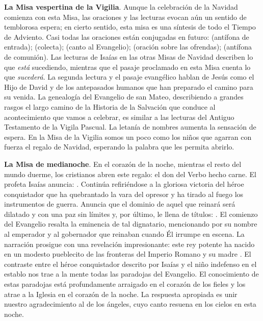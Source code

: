 \begin{body}
\begin{body}
\textbf{La Misa vespertina de la Vigilia}. Aunque la celebración de la Navidad comienza con esta Misa, las oraciones y las lecturas evocan aún un sentido de temblorosa espera; en cierto sentido, esta misa es una síntesis de todo el Tiempo de Adviento. Casi todas las oraciones están conjugadas en futuro:  (antífona de entrada);  (colecta);  (canto al Evangelio);  (oración sobre las ofrendas);  (antífona de comunión). Las lecturas de Isaías en las otras Misas de Navidad describen lo que \emph{está} sucediendo, mientras que el pasaje proclamado en esta Misa cuenta lo que \emph{sucederá}. La segunda lectura y el pasaje evangélico hablan de Jesús como el Hijo de David y de los antepasados humanos que han preparado el camino para su venida. La genealogía del Evangelio de san Mateo, describiendo a grandes rasgos el largo camino de la Historia de la Salvación que conduce al acontecimiento que vamos a celebrar, es similar a las lecturas del Antiguo Testamento de la Vigila Pascual. La letanía de nombres aumenta la sensación de espera. En la Misa de la Vigilia somos un poco como los niños que agarran con fuerza el regalo de Navidad, esperando la palabra que les permita abrirlo.

\textbf{La Misa de medianoche}. En el corazón de la noche, mientras el resto del mundo duerme, los cristianos abren este regalo: el don del Verbo hecho carne. El profeta Isaías anuncia: . Continúa refiriéndose a la gloriosa victoria del héroe conquistador que ha quebrantado la vara del opresor y ha tirado al fuego los instrumentos de guerra. Anuncia que el dominio de aquel que reinará será dilatado y con una paz sin límites y, por último, le llena de títulos: . El comienzo del Evangelio resalta la eminencia de tal dignatario, mencionando por su nombre al emperador y al gobernador que reinaban cuando Él irrumpe en escena. La narración prosigue con una revelación impresionante: este rey potente ha nacido en un modesto pueblecito de las fronteras del Imperio Romano y su madre . El contraste entre el héroe conquistador descrito por Isaías y el niño indefenso en el establo nos trae a la mente todas las paradojas del Evangelio. El conocimiento de estas paradojas está profundamente arraigado en el corazón de los fieles y los atrae a la Iglesia en el corazón de la noche. La respuesta apropiada es unir nuestro agradecimiento al de los ángeles, cuyo canto resuena en los cielos en esta noche.


\end{body}
\end{body}
